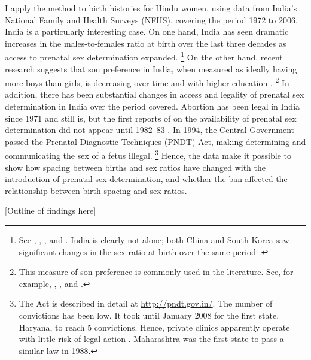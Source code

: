\documentclass[12pt,letterpaper]{article}
\begin{document}
I apply the method to birth histories for Hindu women, using data from 
India's National Family and Health Surveys (NFHS), covering the period 
1972 to 2006. 
India is a particularly interesting case.
On one hand, India has seen dramatic increases in the males-to-females ratio 
at birth over the last three decades as access to prenatal sex determination 
expanded.%
\footnote{
See \citet{das_gupta97}, \citet{Sudha1999},
\citet{Arnold2002}, \cite{retherford03b} and \citet{jha06}.
India is clearly not alone; both China and South Korea saw
significant changes in the sex ratio at birth over the same period 
\citep{Yi1993,park95}.
}
On the other hand, recent research suggests that son preference in 
India, when measured as ideally having more boys than girls, is decreasing 
over time and with higher education \citep{bhat03,pande07}.%
\footnote{
This measure of son preference is commonly used in the literature. 
See, for example, \citet{clark00}, \citet{Jensen2009}, and \cite{Hu2015}.
}
In addition, there has been substantial changes in access and legality of
prenatal sex determination in India over the period covered.
Abortion has been legal in India since 1971 and still is, but the 
first reports of on the availability of prenatal sex determination did
not appear until 1982--83 \citep{Sudha1999,bhat06,Grover2006}.
In 1994, the Central Government passed the Prenatal Diagnostic Techniques 
(PNDT) Act, making determining and communicating the sex of a fetus illegal.%
\footnote{
The Act is described in detail at \href{http://pndt.gov.in/}{http://pndt.gov.in/}.
The number of convictions has been low.
It took until January 2008 for the first state, Haryana, to reach 5 convictions.
Hence, private clinics apparently operate with little risk of legal action 
\citep{Sudha1999}.
Maharashtra was the first state to pass a similar law in 1988.
}
Hence, the data make it possible to show how spacing between births and
sex ratios have changed with the introduction of prenatal sex determination,
and whether the ban affected the relationship between birth spacing and sex 
ratios.

[Outline of findings here]


% 
% 
% 
\end{document}
